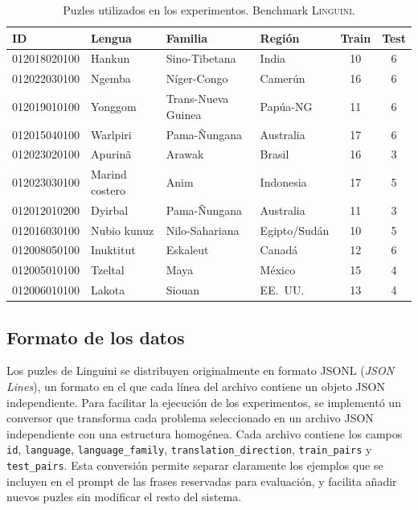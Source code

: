 \begin{table}[ht]
	\centering
	\caption{Puzles utilizados en los experimentos. Benchmark \textsc{Linguini}.}
	\label{tab:puzzles_seleccionados}
	\begin{tabular}{l l l l c c}
		\toprule
		\textbf{ID} & \textbf{Lengua} & \textbf{Familia} & \textbf{Región} & \textbf{Train} & \textbf{Test} \\
		\midrule
		012018020100 & Hankun & Sino-Tibetana & India & 10 & 6 \\
		012022030100 & Ngemba & Níger-Congo & Camerún & 16 & 6 \\
		012019010100 & Yonggom & Trans-Nueva Guinea & Papúa-NG & 11 & 6 \\
		012015040100 & Warlpiri & Pama-Ñungana & Australia & 17 & 6 \\
		012023020100 & Apurinã & Arawak & Brasil & 16 & 3 \\
		012023030100 & Marind costero & Anim & Indonesia & 17 & 5 \\
		012012010200 & Dyirbal & Pama-Ñungana & Australia & 11 & 3 \\
		012016030100 & Nubio kunuz & Nilo-Sahariana & Egipto/Sudán & 10 & 5 \\
		012008050100 & Inuktitut & Eskaleut & Canadá & 12 & 6 \\
		012005010100 & Tzeltal & Maya & México & 15 & 4 \\
		012006010100 & Lakota & Siouan & EE.~UU. & 13 & 4 \\
		\bottomrule
	\end{tabular}
\end{table}

\subsection{Formato de los datos}

Los puzles de Linguini se distribuyen originalmente en formato JSONL (\textit{JSON Lines}), un formato en el que cada línea del archivo contiene un objeto JSON independiente. Para facilitar la ejecución de los experimentos, se implementó un conversor que transforma cada problema seleccionado en un archivo JSON independiente con una estructura homogénea. Cada archivo contiene los campos \texttt{id}, \texttt{language}, \texttt{language\_family}, \texttt{translation\_direction}, \texttt{train\_pairs} y \texttt{test\_pairs}. Esta conversión permite separar claramente los ejemplos que se incluyen en el prompt de las frases reservadas para evaluación, y facilita añadir nuevos puzles sin modificar el resto del sistema.

